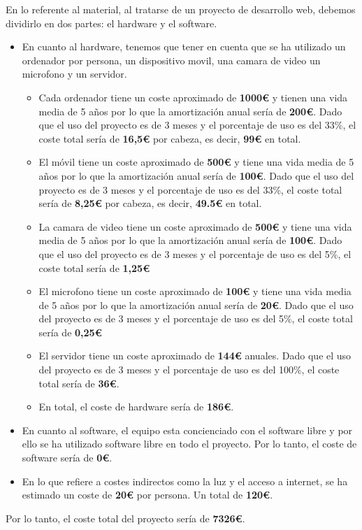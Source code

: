 \documentclass{report}
\begin{document}
{            En lo referente al material, al tratarse de un proyecto de desarrollo web, debemos dividirlo en dos partes: el hardware y el software.\\
            \begin{itemize}
                \item En cuanto al hardware, tenemos que tener en cuenta que se ha utilizado un ordenador por persona, un dispositivo movil, una camara de video un microfono y un servidor.
                \begin{itemize}
                    \item Cada ordenador tiene un coste aproximado de \textbf{1000€} y tienen una vida media de 5 años por lo que la amortización anual sería de \textbf{200€}. Dado que el uso del proyecto es de 3 meses y el porcentaje de uso es del 33\%, el coste total sería de \textbf{16,5€} por cabeza, es decir, \textbf{99€} en total.
                    \item El móvil tiene un coste aproximado de \textbf{500€} y tiene una vida media de 5 años por lo que la amortización anual sería de \textbf{100€}. Dado que el uso del proyecto es de 3 meses y el porcentaje de uso es del 33\%, el coste total sería de \textbf{8,25€} por cabeza, es decir, \textbf{49.5€} en total.
                    \item La camara de video tiene un coste aproximado de \textbf{500€} y tiene una vida media de 5 años por lo que la amortización anual sería de \textbf{100€}. Dado que el uso del proyecto es de 3 meses y el porcentaje de uso es del 5\%, el coste total sería de \textbf{1,25€}
                    \item El microfono tiene un coste aproximado de \textbf{100€} y tiene una vida media de 5 años por lo que la amortización anual sería de \textbf{20€}. Dado que el uso del proyecto es de 3 meses y el porcentaje de uso es del 5\%, el coste total sería de \textbf{0,25€}
                    \item El servidor tiene un coste aproximado de \textbf{144€} anuales. Dado que el uso del proyecto es de 3 meses y el porcentaje de uso es del 100\%, el coste total sería de \textbf{36€}.
                    \item En total, el coste de hardware sería de \textbf{186€}.
                \end{itemize}
                \item En cuanto al software, el equipo esta concienciado con el software libre y por ello se ha utilizado software libre en todo el proyecto. Por lo tanto, el coste de software sería de \textbf{0€}.
                \item En lo que refiere a costes indirectos como la luz y el acceso a internet, se ha estimado un coste de \textbf{20€} por persona. Un total de \textbf{120€}.
            \end{itemize}
            Por lo tanto, el coste total del proyecto sería de \textbf{7326€}.
        }
\end{document}

